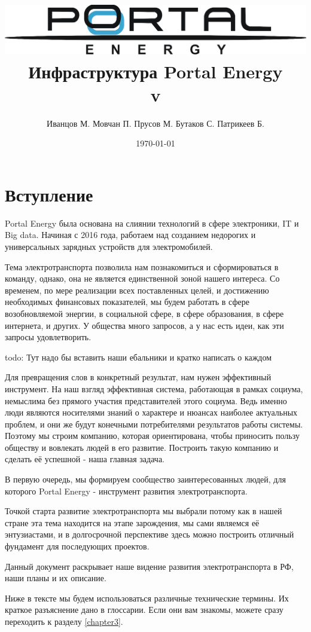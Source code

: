 \documentclass[a4paper,12pt]{report}
\title{\includegraphics[width=14cm]{logo}\\[2cm]Инфраструктура Portal Energy \\\normalsize v\versionnumber}
\author{Иванцов М. Мовчан П. Прусов М. Бутаков С. Патрикеев Б.}
\date{\today}
\begin{document}
%
\maketitle
\tableofcontents
\clearpage


\chapter{Вступление}

Portal Energy была основана на слиянии технологий в сфере электроники, IT и Big data. Начиная с 2016 года, работаем над созданием недорогих и универсальных зарядных устройств для электромобилей. 

Тема электротранспорта позволила нам познакомиться и сформироваться в команду, однако, она не является единственной зоной нашего интереса. Со временем, по мере реализации всех поставленных целей, и достижению необходимых финансовых показателей, мы будем работать в сфере возобновляемой энергии, в социальной сфере, в сфере образования, в сфере интернета, и других. У общества много запросов, а у нас есть идеи, как эти запросы удовлетворить. 

todo: Тут надо бы вставить наши ебальники и кратко написать о каждом

Для превращения слов в конкретный результат, нам нужен эффективный инструмент. На наш взгляд эффективная система, работающая в рамках социума, немыслима без прямого участия представителей этого социума. Ведь именно люди являются носителями знаний о характере и нюансах наиболее актуальных проблем, и они же будут конечными потребителями результатов работы системы. Поэтому мы строим компанию, которая ориентирована, чтобы приносить пользу обществу и вовлекать людей в его развитие. Построить такую компанию и сделать её успешной - наша главная задача. 

В первую очередь, мы формируем сообщество заинтересованных людей, для которого Portal Energy -  инструмент развития электротранспорта.

Точкой старта развитие электротранспорта мы выбрали потому как в нашей стране эта тема находится на этапе зарождения, мы сами являемся её энтузиастами, и в долгосрочной перспективе здесь можно построить отличный фундамент для последующих проектов. 

Данный документ раскрывает наше видение развития электротранспорта в РФ, наши планы и их описание.

Ниже в тексте мы будем использоваться различные технические термины. Их краткое разъяснение дано в глоссарии. Если они вам знакомы, можете сразу переходить к разделу \ref{chapter3}.
\end{document}
